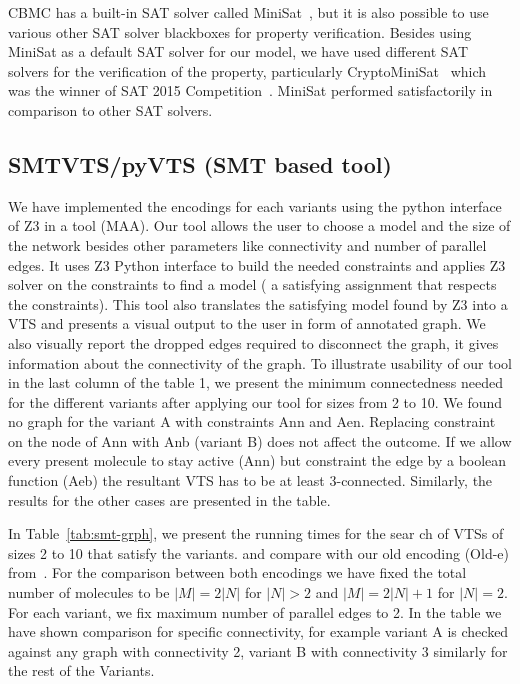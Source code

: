 CBMC has a built-in SAT solver called MiniSat~\cite{sorensson2005minisat}, but it is also possible to use various other SAT solver blackboxes for property verification. Besides using MiniSat as a default SAT solver for our model, we have used different SAT solvers for the verification of the property, particularly CryptoMiniSat~\cite{soos2016cryptominisat} which was the winner of SAT 2015 Competition~\cite{balyo2016sat}. 
%		
MiniSat performed satisfactorily in comparison to other SAT solvers.

\subsection{SMTVTS/pyVTS (SMT based tool)}
	We have implemented the encodings for each variants using the python interface of Z3 in a tool (MAA). 
%
Our tool allows the user to choose a model and the size
of the network besides other parameters like connectivity and number of parallel edges. 
%		
It uses Z3 Python interface to build the needed constraints and applies Z3 solver on the constraints to find a model ( a satisfying assignment that respects the constraints). 
%
This tool also translates the satisfying model found by Z3 into
a VTS and presents a visual output to the user in form of annotated graph. 
%
We also visually report the dropped edges required to disconnect the graph, it gives information about the connectivity of the graph.
%
To illustrate usability of our tool in the last column of the table 1, we present the minimum connectedness needed for the different variants after applying our tool for sizes from 2 to 10. 
%
We found no graph for the variant A with constraints Ann and Aen. 
%
Replacing constraint on the node of Ann with Anb (variant B)
does not affect the outcome. 
%
If we allow every present molecule to stay active
(Ann) but constraint the edge by a boolean function (Aeb) the resultant VTS has to be at least 3-connected. 
%
Similarly, the results for the other cases are presented in the table.



In Table~\ref{tab:smt-grph}, we present the running times for the sear
ch of
VTSs of sizes 2 to 10 that satisfy the variants.
and compare with our old encoding
({Old-e}) from~\cite{shukla}.
%
For the comparison between both encodings we have fixed the total
number of molecules to be $|M| = 2|N|$ for $ |N|> 2$ and
$|M| = 2|N| + 1$ for $|N| = 2$.
%
For each variant, we fix maximum number of parallel
edges to 2.
%
In the table we have shown comparison for specific connectivity, for
example variant A is checked against any graph with connectivity 2,
variant B with connectivity 3 similarly for the rest of the Variants.
%

